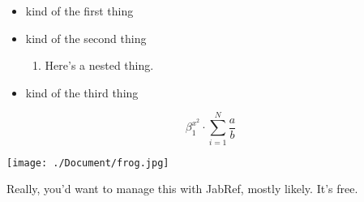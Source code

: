 \documentclass{article}
\begin{document}
\begin{itemize}
\item kind of the first thing
\item kind of the second thing
\begin{enumerate}
	\item Here's a nested thing.
\end{enumerate}
\item kind of the third thing \cite{HallEffect}
\end{itemize}

$$\beta_1^{x^2} \cdot \sum_{i=1}^N{\frac{a}{b}}$$

\texttt{[image: ./Document/frog.jpg]}



Really, you'd want to manage this with JabRef, mostly likely. It's free.
\end{document}
